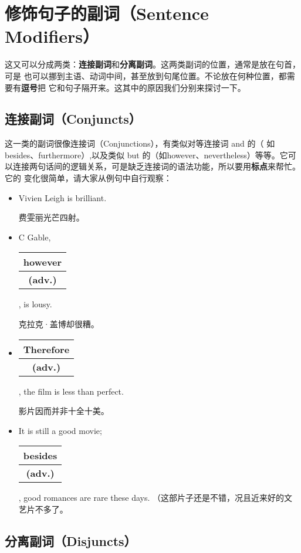 \documentclass{yufa}
\makeatletter
\newcommand\unct[2]{\def\arraystretch{0.8}
  {\setlength{\tabcolsep}{0pt}
    \begin{tabular}[t]{@{}c@{}} \setlength\arrayrulewidth{0.8pt} \textbf{#1}\\\hline \textbf{\small #2} \\\end{tabular}}}
\makeatother
\begin{document}
\section{修饰句子的副词（Sentence Modifiers）}

这又可以分成两类：\textbf{连接副词}和\textbf{分离副词}。这两类副词的位置，通常是放在句首，可是
也可以挪到主语、动词中间，甚至放到句尾位置。不论放在何种位置，都需要有\textbf{逗号}把
它和句子隔开来。这其中的原因我们分别来探讨一下。

\subsection{连接副词（Conjuncts）}

这一类的副词很像连接词（Conjunctions），有类似对等连接词 and 的（
如besides、furthermore）,以及类似 but 的（如however、nevertheless）等等。它可
以连接两句话间的逻辑关系，可是缺乏连接词的语法功能，所以要用\textbf{标点}来帮忙。它的
变化很简单，请大家从例句中自行观察：

\begin{itemize}
\item Vivien Leigh is brilliant.

  费雯丽光芒四射。
\item C Gable, \unct{however}{(adv.)}, is lousy.

  克拉克·盖博却很糟。
\item \unct{Therefore}{(adv.)}, the film is less than perfect.

  影片因而并非十全十美。
\item  It is still a good movie; \unct{besides}{(adv.)}, good romances are rare these days.
  （这部片子还是不错，况且近来好的文艺片不多了。
\end{itemize}

\subsection{分离副词（Disjuncts）}
\end{document}
